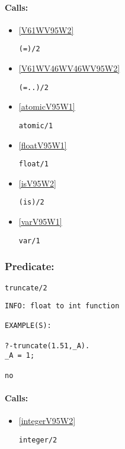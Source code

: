 \paragraph{Calls:} 
\begin{itemize}
\item \ref{V61WV95W2} 
\begin{verbatim}
(=)/2
\end{verbatim}

\item \ref{V61WV46WV46WV95W2} 
\begin{verbatim}
(=..)/2
\end{verbatim}

\item \ref{atomicV95W1} 
\begin{verbatim}
atomic/1
\end{verbatim}

\item \ref{floatV95W1} 
\begin{verbatim}
float/1
\end{verbatim}

\item \ref{isV95W2} 
\begin{verbatim}
(is)/2
\end{verbatim}

\item \ref{varV95W1} 
\begin{verbatim}
var/1
\end{verbatim}

\end{itemize}

\subsubsection{Predicate:} \label{truncateV95W2}

\begin{verbatim}
truncate/2
\end{verbatim}

{\small \begin{verbatim}
INFO: float to int function

EXAMPLE(S):

?-truncate(1.51,_A).
_A = 1;

no

\end{verbatim}}
\paragraph{Calls:} 
\begin{itemize}
\item \ref{integerV95W2} 
\begin{verbatim}
integer/2
\end{verbatim}

\end{itemize}

